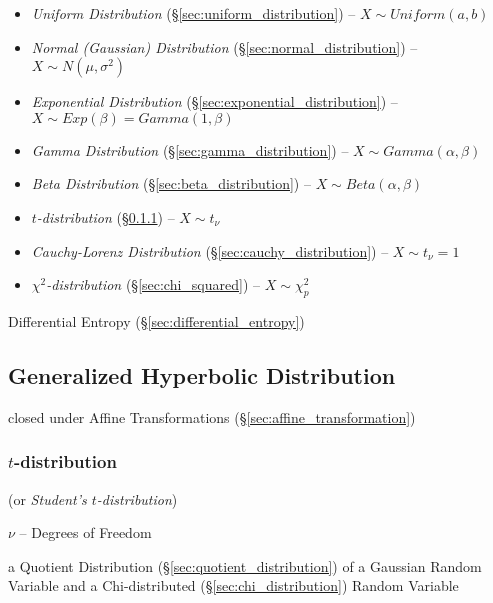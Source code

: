 \begin{itemize}
  \item \emph{Uniform Distribution} (\S\ref{sec:uniform_distribution}) --
    $X \sim Uniform(a,b)$
  \item \emph{Normal (Gaussian) Distribution} (\S\ref{sec:normal_distribution})
    -- $X \sim N(\mu, \sigma^2)$
  \item \emph{Exponential Distribution} (\S\ref{sec:exponential_distribution})
    -- $X \sim Exp(\beta) = Gamma(1, \beta)$
  \item \emph{Gamma Distribution} (\S\ref{sec:gamma_distribution})
    -- $X \sim Gamma(\alpha, \beta)$
  \item \emph{Beta Distribution} (\S\ref{sec:beta_distribution})
    -- $X \sim Beta(\alpha, \beta)$
  \item \emph{$t$-distribution} (\S\ref{sec:t_distribution})
    -- $X \sim t_\nu$
  \item \emph{Cauchy-Lorenz Distribution} (\S\ref{sec:cauchy_distribution})
    -- $X \sim t_\nu=1$
  \item \emph{$\chi^2$-distribution} (\S\ref{sec:chi_squared})
    -- $X \sim \chi^2_p$
\end{itemize}

Differential Entropy (\S\ref{sec:differential_entropy})



\subsection{Generalized Hyperbolic Distribution}
\label{sec:generalized_hyperbolic}

closed under Affine Transformations (\S\ref{sec:affine_transformation})



\subsubsection{$t$-distribution}\label{sec:t_distribution}

(or \emph{Student's $t$-distribution})

$\nu$ -- Degrees of Freedom

a Quotient Distribution (\S\ref{sec:quotient_distribution}) of a Gaussian Random
Variable and a Chi-distributed (\S\ref{sec:chi_distribution}) Random Variable

